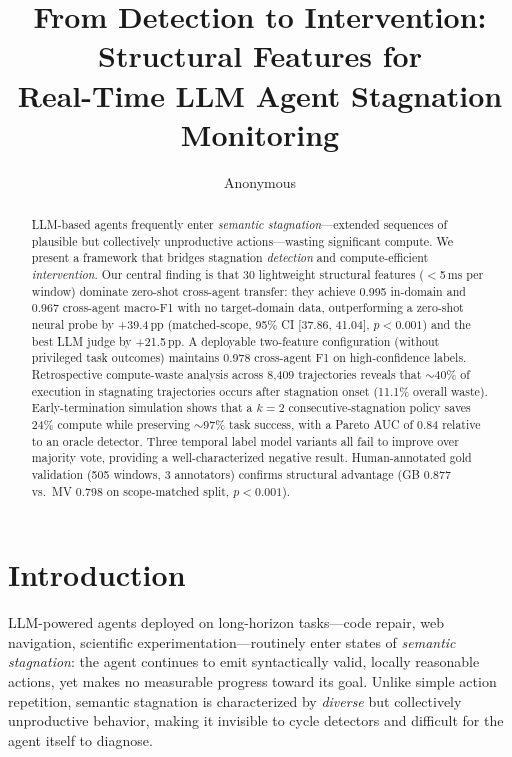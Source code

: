 \documentclass[11pt,a4paper]{article}
\title{From Detection to Intervention: Structural Features for\\Real-Time LLM Agent Stagnation Monitoring}
\author{Anonymous}
\date{}
\begin{document}
\maketitle

\begin{abstract}
LLM-based agents frequently enter \emph{semantic stagnation}---extended sequences of plausible but collectively unproductive actions---wasting significant compute.
We present a framework that bridges stagnation \emph{detection} and compute-efficient \emph{intervention}.
Our central finding is that 30 lightweight structural features ($<$5\,ms per window) dominate zero-shot cross-agent transfer:
they achieve 0.995 in-domain and 0.967 cross-agent macro-F1 with no target-domain data,
outperforming a zero-shot neural probe by +39.4\,pp (matched-scope, 95\% CI [37.86, 41.04], $p<0.001$) and the best LLM judge by +21.5\,pp.
A deployable two-feature configuration (without privileged task outcomes) maintains 0.978 cross-agent F1 on high-confidence labels.
Retrospective compute-waste analysis across 8{,}409 trajectories reveals that $\sim$40\% of execution in stagnating trajectories occurs after stagnation onset (11.1\% overall waste).
Early-termination simulation shows that a $k{=}2$ consecutive-stagnation policy saves 24\% compute while preserving $\sim$97\% task success, with a Pareto AUC of 0.84 relative to an oracle detector.
Three temporal label model variants all fail to improve over majority vote, providing a well-characterized negative result.
Human-annotated gold validation (505 windows, 3 annotators) confirms structural advantage (GB 0.877 vs.\ MV 0.798 on scope-matched split, $p<0.001$).
\end{abstract}

\section{Introduction}

LLM-powered agents deployed on long-horizon tasks---code repair, web navigation, scientific experimentation---routinely enter states of \emph{semantic stagnation}: the agent continues to emit syntactically valid, locally reasonable actions, yet makes no measurable progress toward its goal.
Unlike simple action repetition, semantic stagnation is characterized by \emph{diverse} but collectively unproductive behavior, making it invisible to cycle detectors and difficult for the agent itself to diagnose.
\end{document}

